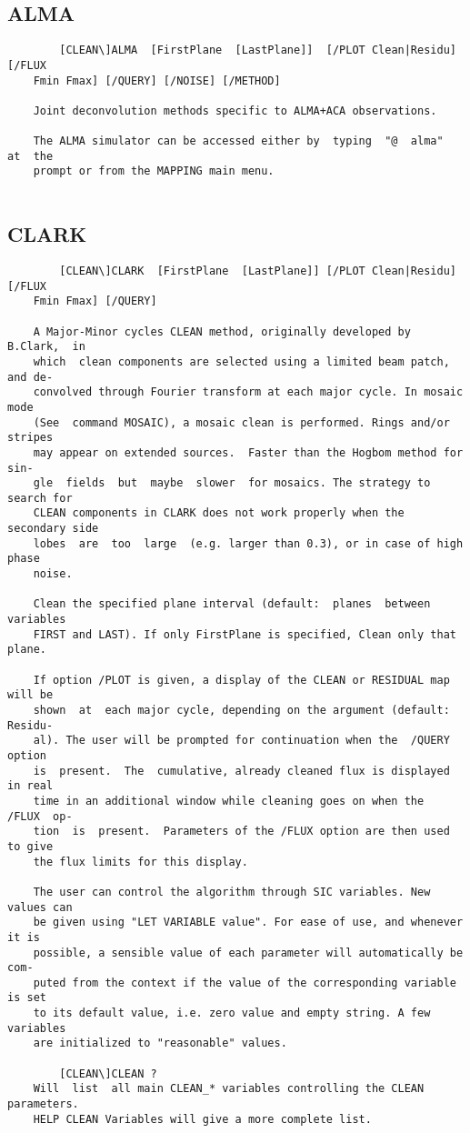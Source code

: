 \subsection{ALMA}
\begin{verbatim}
        [CLEAN\]ALMA  [FirstPlane  [LastPlane]]  [/PLOT Clean|Residu] [/FLUX
    Fmin Fmax] [/QUERY] [/NOISE] [/METHOD]

    Joint deconvolution methods specific to ALMA+ACA observations.

    The ALMA simulator can be accessed either by  typing  "@  alma"  at  the
    prompt or from the MAPPING main menu.


\end{verbatim}
\subsection{CLARK}
\begin{verbatim}
        [CLEAN\]CLARK  [FirstPlane  [LastPlane]] [/PLOT Clean|Residu] [/FLUX
    Fmin Fmax] [/QUERY]

    A Major-Minor cycles CLEAN method, originally developed by  B.Clark,  in
    which  clean components are selected using a limited beam patch, and de-
    convolved through Fourier transform at each major cycle. In mosaic  mode
    (See  command MOSAIC), a mosaic clean is performed. Rings and/or stripes
    may appear on extended sources.  Faster than the Hogbom method for  sin-
    gle  fields  but  maybe  slower  for mosaics. The strategy to search for
    CLEAN components in CLARK does not work properly when the secondary side
    lobes  are  too  large  (e.g. larger than 0.3), or in case of high phase
    noise.

    Clean the specified plane interval (default:  planes  between  variables
    FIRST and LAST). If only FirstPlane is specified, Clean only that plane.

    If option /PLOT is given, a display of the CLEAN or RESIDUAL map will be
    shown  at  each major cycle, depending on the argument (default: Residu-
    al). The user will be prompted for continuation when the  /QUERY  option
    is  present.  The  cumulative, already cleaned flux is displayed in real
    time in an additional window while cleaning goes on when the  /FLUX  op-
    tion  is  present.  Parameters of the /FLUX option are then used to give
    the flux limits for this display.

    The user can control the algorithm through SIC variables. New values can
    be given using "LET VARIABLE value". For ease of use, and whenever it is
    possible, a sensible value of each parameter will automatically be  com-
    puted from the context if the value of the corresponding variable is set
    to its default value, i.e. zero value and empty string. A few  variables
    are initialized to "reasonable" values.

        [CLEAN\]CLEAN ?
    Will  list  all main CLEAN_* variables controlling the CLEAN parameters.
    HELP CLEAN Variables will give a more complete list.

\end{verbatim}
